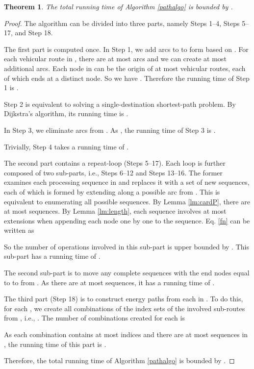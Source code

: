 \documentclass[journal]{IEEEtran}
\newtheorem{theorem}{\textbf{Theorem}}
\begin{document}
\begin{theorem} \label{thm:runtime}
The total running time of Algorithm \ref{pathalgo} is bounded by .
\end{theorem}


\begin{proof}
The algorithm can be divided into three parts, namely Steps 1--4, Steps 5--17, and Step 18.

The first part is computed once. In Step 1, we add arcs to  to form  based on . For each vehicular route in , there are at most  arcs and we can create at most  additional arcs. Each node in  can be the origin of at most  vehicular routes, each of which ends at a distinct node. So we have . Therefore the running time of Step 1 is .

Step 2 is equivalent to solving a single-destination shortest-path problem. By Dijkstra's algorithm, its running time is  \cite{dijkstra}.

In Step 3, we eliminate arcs from . As , the running time of Step 3 is .

Trivially, Step 4 takes a running time of .

The second part contains a repeat-loop (Steps 5--17). Each loop is further composed of two sub-parts, i.e., Steps 6--12 and Steps 13--16. The former examines each processing sequence  in  and replaces it with a set of new sequences, each of which is formed by extending  along a possible arc from . This is equivalent to enumerating all possible sequences. By Lemma \ref{lm:cardP}, there are at most  sequences. By Lemma \ref{lm:length}, each sequence involves at most  extensions when appending each node one by one to the sequence.
Eq. \eqref{fn} can be written as

So the number of operations involved in this sub-part is upper bounded by .
 This sub-part has a running time of .

The second sub-part is to move any complete sequences with the end nodes equal to  to  from . As there are at most  sequences, it has a running time of .

The third part (Step 18) is to construct energy paths from each  in . To do this, for each , we create all combinations of the index sets of the involved sub-routes from , i.e., . The number of combinations created for each  is 

As each combination contains at most  indices and there are at most  sequences in , the running time of this part is .

Therefore, the total running time of Algorithm \ref{pathalgo} is bounded by .
\end{proof}
\end{document}
